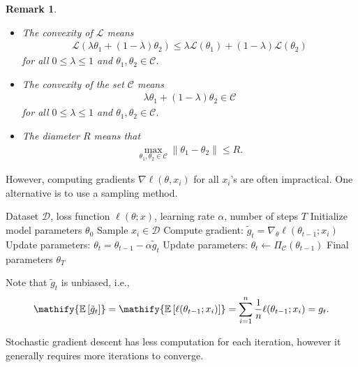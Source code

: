 \documentclass[11pt, a4paper]{article}
\newtheorem{remark}{Remark}
\newcommand{\E}[1]{\mathify{\mathbb{E}\left[#1\right]}}
\begin{document}
\begin{remark}
    \begin{itemize}
        \item  The convexity of $\mathcal{L}$ means
    \begin{align}
        \mathcal{L}(\lambda \theta_1 + (1-\lambda)\theta_2) \leq \lambda \mathcal{L}(\theta_1) + (1-\lambda) \mathcal{L}(\theta_2)
    \end{align}
    for all $0\leq \lambda\leq 1$ and $\theta_1, \theta_2\in\mathcal{C}$.
    \item The convexity of the set $\mathcal{C}$ means
    \begin{align}
        \lambda \theta_1 + (1-\lambda)\theta_2\in\mathcal{C}
    \end{align}
    for all $0\leq \lambda\leq 1$ and $\theta_1, \theta_2\in\mathcal{C}$.
    \item The diameter $R$ means that 
    \begin{align}
        \max_{\theta_1,\theta_2\in\mathcal{C}} \|\theta_1-\theta_2\|\leq R.
    \end{align}
    \end{itemize}
\end{remark}

However, computing gradients $\nabla \ell(\theta, x_i)$ for all $x_i$'s are often impractical.
One alternative is to use a sampling method.
\begin{algorithm}[H]
\caption{Stochastic Gradient Descent (SGD)}
\begin{algorithmic}[1]
\REQUIRE Dataset $\mathcal{D}$, loss function $\ell(\theta; x)$, learning rate $\alpha$, number of steps $T$
\STATE Initialize model parameters $\theta_0$
    \STATE Sample $x_i\in \mathcal{D}$
    \STATE Compute gradient: $\tilde{g}_t = \nabla_\theta \ell(\theta_{t-1}; x_i)$
    \STATE Update parameters: $\theta_t = \theta_{t-1} - \alpha\tilde{g}_t$
    \STATE Update parameters: $\theta_t \leftarrow \Pi_{\mathcal{C}}(\theta_{t-1})$
\ENDFOR
\RETURN Final parameters $\theta_T$
\end{algorithmic}
\end{algorithm}
Note that $\tilde{g}_t$ is unbiased, i.e.,
\begin{align}
    \E{\tilde{g}_t} = \E{\ell(\theta_{t-1};x_i)} = \sum_{i=1}^n \frac{1}{n} \ell(\theta_{t-1};x_i) = g_t.
\end{align}

Stochastic gradient descent has less computation for each iteration,
however it generally requires more iterations to converge.
\end{document}
